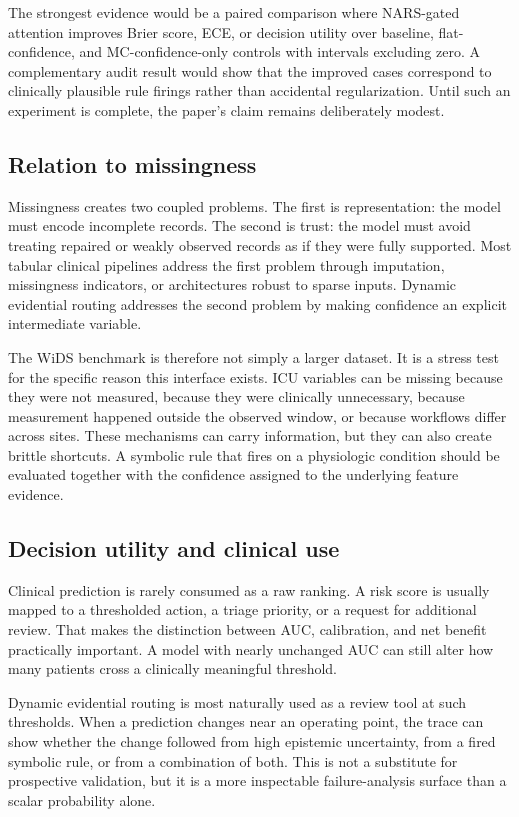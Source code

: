 \documentclass{article}
\begin{document}
The strongest evidence would be a paired comparison where NARS-gated attention improves Brier score, ECE, or decision utility over baseline, flat-confidence, and MC-confidence-only controls with intervals excluding zero. A complementary audit result would show that the improved cases correspond to clinically plausible rule firings rather than accidental regularization. Until such an experiment is complete, the paper's claim remains deliberately modest.

\subsection{Relation to missingness}

Missingness creates two coupled problems. The first is representation: the model must encode incomplete records. The second is trust: the model must avoid treating repaired or weakly observed records as if they were fully supported. Most tabular clinical pipelines address the first problem through imputation, missingness indicators, or architectures robust to sparse inputs. Dynamic evidential routing addresses the second problem by making confidence an explicit intermediate variable.

The WiDS benchmark is therefore not simply a larger dataset. It is a stress test for the specific reason this interface exists. ICU variables can be missing because they were not measured, because they were clinically unnecessary, because measurement happened outside the observed window, or because workflows differ across sites. These mechanisms can carry information, but they can also create brittle shortcuts. A symbolic rule that fires on a physiologic condition should be evaluated together with the confidence assigned to the underlying feature evidence.

\subsection{Decision utility and clinical use}

Clinical prediction is rarely consumed as a raw ranking. A risk score is usually mapped to a thresholded action, a triage priority, or a request for additional review. That makes the distinction between AUC, calibration, and net benefit practically important. A model with nearly unchanged AUC can still alter how many patients cross a clinically meaningful threshold.

Dynamic evidential routing is most naturally used as a review tool at such thresholds. When a prediction changes near an operating point, the trace can show whether the change followed from high epistemic uncertainty, from a fired symbolic rule, or from a combination of both. This is not a substitute for prospective validation, but it is a more inspectable failure-analysis surface than a scalar probability alone.
\end{document}
